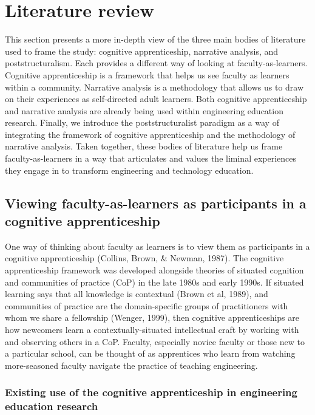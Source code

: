 \section{Literature review}

This section presents a more in-depth view of the three main bodies of literature used to frame the study: cognitive apprenticeship, narrative analysis, and poststructuralism. Each provides a different way of looking at faculty-as-learners. Cognitive apprenticeship is a framework that helps us see faculty as learners within a community. Narrative analysis is a methodology that allows us to draw on their experiences as self-directed adult learners. Both cognitive apprenticeship and narrative analysis are already being used within engineering education research. Finally, we introduce the poststructuralist paradigm as a way of integrating the framework of cognitive apprenticeship and the methodology of narrative analysis. Taken together, these bodies of literature help us frame faculty-as-learners in a way that articulates and values the liminal experiences they engage in to transform engineering and technology education.

\subsection{Viewing faculty-as-learners as participants in a cognitive apprenticeship}

One way of thinking about faculty as learners is to view them as participants in a cognitive apprenticeship (Collins, Brown, & Newman, 1987). The cognitive apprenticeship framework was developed alongside theories of situated cognition and communities of practice (CoP) in the late 1980s and early 1990s. If situated learning says that all knowledge is contextual (Brown et al, 1989), and communities of practice are the domain-specific groups of practitioners with whom we share a fellowship (Wenger, 1999), then cognitive apprenticeships are how newcomers learn a contextually-situated intellectual craft by working with and observing others in a CoP. Faculty, especially novice faculty or those new to a particular school, can be thought of as apprentices who learn from watching more-seasoned faculty navigate the practice of teaching engineering.

\subsubsection{Existing use of the cognitive apprenticeship in engineering education research}

